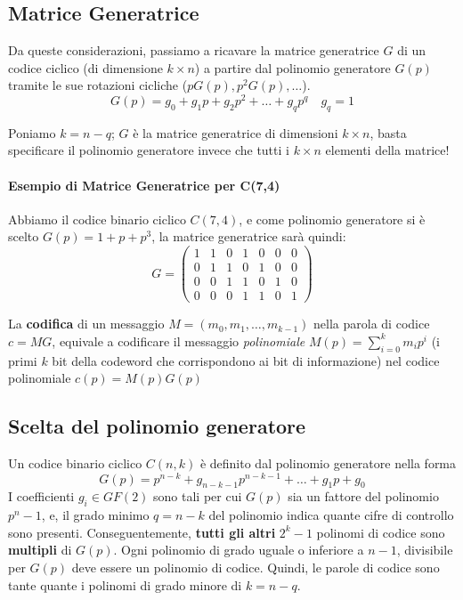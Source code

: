 \subsection{Matrice Generatrice}
Da queste considerazioni, passiamo a ricavare la matrice generatrice $G$ di un codice ciclico (di dimensione $k \times n$) a partire dal polinomio generatore $G(p)$ tramite le sue rotazioni cicliche ($pG(p),p^2G(p),\dots$).
\[G(p)= g_0+ g_1p+g_2p^2+ \dots + g_qp^q \quad g_q= 1\] 



Poniamo $k=n-q$; $G$ è la matrice generatrice di dimensioni $k \times n$, basta specificare il polinomio generatore invece che tutti i $k \times n$ elementi della matrice!

\paragraph{Esempio di Matrice Generatrice per C(7,4)}

Abbiamo il codice binario ciclico $C(7,4)$, e come polinomio generatore si è scelto $G(p) = 1 + p+p^3$, la matrice  generatrice sarà quindi:
$$G = \begin{pmatrix} 
1 & 1 & 0 & 1 & 0 & 0 & 0 \\
0 & 1 & 1 & 0 & 1 & 0 & 0 \\
0 & 0 & 1 & 1 & 0 & 1 & 0 \\
0 & 0 & 0 & 1 & 1 & 0 & 1 
\end{pmatrix}$$



La \textbf{codifica} di un messaggio $M=(m_0,m_1, \dots, m_{k-1})$ nella parola di codice $c=MG$, equivale a codificare il messaggio \textit{polinomiale} $M(p)= \sum_{i=0}^km_i p^i$ (i primi $k$ bit della codeword che corrispondono ai bit di informazione) nel codice polinomiale $c(p)=M(p)G(p)$

\subsection{Scelta del polinomio generatore}
Un codice binario ciclico $C(n,k)$ è definito dal polinomio generatore nella forma
\[G(p)=p^{n-k}+g_{n-k-1}p^{n-k-1} + \dots + g_1p + g_0\]
I coefficienti $g_i \in GF(2)$ sono tali per cui $G(p)$ sia un fattore del polinomio $p^n-1$, e, il grado minimo $q=n-k$ del polinomio indica quante cifre di controllo sono presenti.
Conseguentemente, \textbf{tutti gli altri} $2^k -1$ polinomi di codice sono \textbf{multipli} di $G(p)$.
Ogni polinomio di grado uguale o inferiore a $n-1$, divisibile per $G(p)$ deve essere un polinomio di codice. Quindi, le parole di codice sono tante quante i polinomi di grado minore di $k= n-q$.

